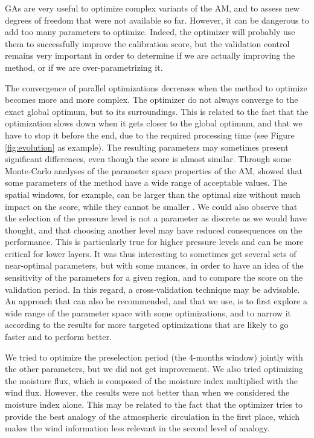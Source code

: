 \documentclass[5p]{elsarticle}
\begin{document}
GAs are very useful to optimize complex variants of the AM, and to assess new degrees of freedom that were not available so far. However, it can be dangerous to add too many parameters to optimize. Indeed, the optimizer will probably use them to successfully improve the calibration score, but the validation control remains very important in order to determine if we are actually improving the method, or if we are over-parametrizing it.

The convergence of parallel optimizations decreases when the method to optimize becomes more and more complex. The optimizer do not always converge to the exact global optimum, but to its surroundings. This is related to the fact that the optimization slows down when it gets closer to the global optimum, and that we have to stop it before the end, due to the required processing time (see Figure \ref{fig:evolution} as example). The resulting parameters may sometimes present significant differences, even though the score is almost similar. Through some Monte-Carlo analyses of the parameter space properties of the AM, \citet{Horton2012a} showed that some parameters of the method have a wide range of acceptable values. The spatial windows, for example, can be larger than the optimal size without much impact on the score, while they cannot be smaller \citep[see also][]{Bontron2004}. We could also observe that the selection of the pressure level is not a parameter as discrete as we would have thought, and that choosing another level may have reduced consequences on the performance. This is particularly true for higher pressure levels and can be more critical for lower layers. It was thus interesting to sometimes get several sets of near-optimal parameters, but with some nuances, in order to have an idea of the sensitivity of the parameters for a given region, and to compare the score on the validation period. In this regard, a cross-validation technique may be advisable. An approach that can also be recommended, and that we use, is to first explore a wide range of the parameter space with some optimizations, and to narrow it according to the results for more targeted optimizations that are likely to go faster and to perform better.

We tried to optimize the preselection period (the 4-months window) jointly with the other parameters, but we did not get improvement. We also tried optimizing the moisture flux, which is composed of the moisture index multiplied with the wind flux. However, the results were not better than when we considered the moisture index alone. This may be related to the fact that the optimizer tries to provide the best analogy of the atmospheric circulation in the first place, which makes the wind information less relevant in the second level of analogy.
\end{document}
